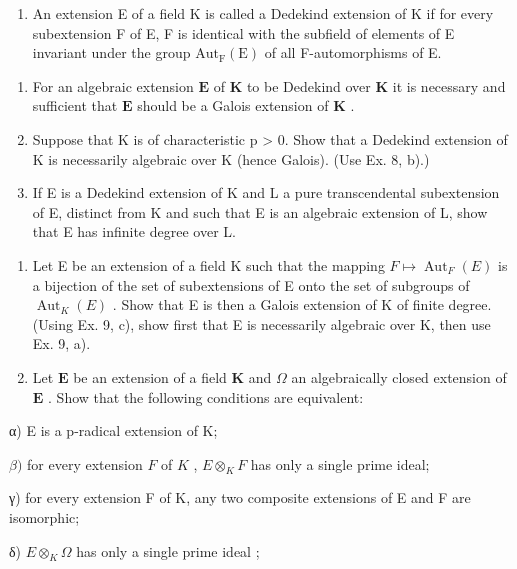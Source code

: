 \begin{enumerate}
\def\labelenumi{\arabic{enumi})}
\setcounter{enumi}{8}
\tightlist
\item
  An extension E of a field K is called a Dedekind extension of K if for every subextension F of E, F is identical with the subfield of elements of E invariant under the group \(\mathrm{Aut}_{\mathrm{F}}(\mathrm{E})\) of all F-automorphisms of E.
\end{enumerate}

\begin{enumerate}
\def\labelenumi{\alph{enumi})}
\item
  For an algebraic extension \(\mathbf{E}\) of \(\mathbf{K}\) to be Dedekind over \(\mathbf{K}\) it is necessary and sufficient that \(\mathbf{E}\) should be a Galois extension of \(\mathbf{K}\) .
\item
  Suppose that K is of characteristic p \textgreater{} 0. Show that a Dedekind extension of K is necessarily algebraic over K (hence Galois). (Use Ex. 8, b).)
\item
  If E is a Dedekind extension of K and L a pure transcendental subextension of E, distinct from K and such that E is an algebraic extension of L, show that E has infinite degree over L.
\end{enumerate}

\begin{enumerate}
\def\labelenumi{\arabic{enumi})}
\setcounter{enumi}{9}
\item
  Let E be an extension of a field K such that the mapping \(F \mapsto \operatorname{Aut}_{F}(E)\) is a bijection of the set of subextensions of E onto the set of subgroups of \(\operatorname{Aut}_{K}(E)\) . Show that E is then a Galois extension of K of finite degree. (Using Ex. 9, c), show first that E is necessarily algebraic over K, then use Ex. 9, a).
\item
  Let \(\mathbf{E}\) be an extension of a field \(\mathbf{K}\) and \(\Omega\) an algebraically closed extension of \(\mathbf{E}\) . Show that the following conditions are equivalent:
\end{enumerate}

α) E is a p-radical extension of K;

\(\beta)\) for every extension \(F\) of \(K\) , \(E \otimes_{K} F\) has only a single prime ideal;

γ) for every extension F of K, any two composite extensions of E and F are isomorphic;

δ) \(E \otimes_{K} \Omega\) has only a single prime ideal ;


